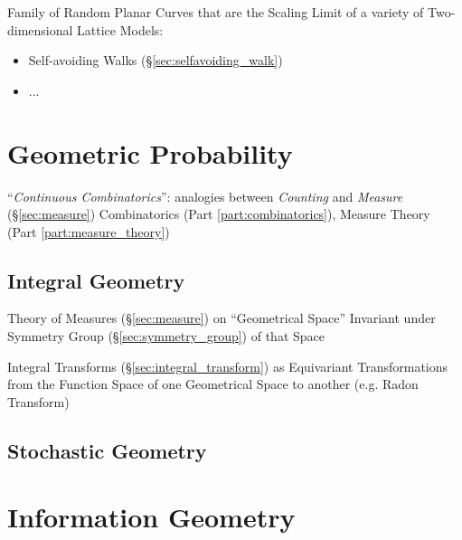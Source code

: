 Family of Random Planar Curves that are the Scaling Limit of a variety of
Two-dimensional Lattice Models:
\begin{itemize}
  \item Self-avoiding Walks (\S\ref{sec:selfavoiding_walk})
  \item ...
\end{itemize}



\section{Geometric Probability}\label{sec:geometric_probability}

``\emph{Continuous Combinatorics}'': analogies between \emph{Counting} and
\emph{Measure} (\S\ref{sec:measure}) \fist Combinatorics (Part
\ref{part:combinatorics}), Measure Theory (Part \ref{part:measure_theory})



\subsection{Integral Geometry}\label{sec:integral_geometry}

Theory of Measures (\S\ref{sec:measure}) on ``Geometrical Space'' Invariant
under Symmetry Group (\S\ref{sec:symmetry_group}) of that Space

Integral Transforms (\S\ref{sec:integral_transform}) as Equivariant
Transformations from the Function Space of one Geometrical Space to another
(e.g. Radon Transform)



\subsection{Stochastic Geometry}\label{sec:stochastic_geometry}



\section{Information Geometry}\label{sec:information_geometry}

